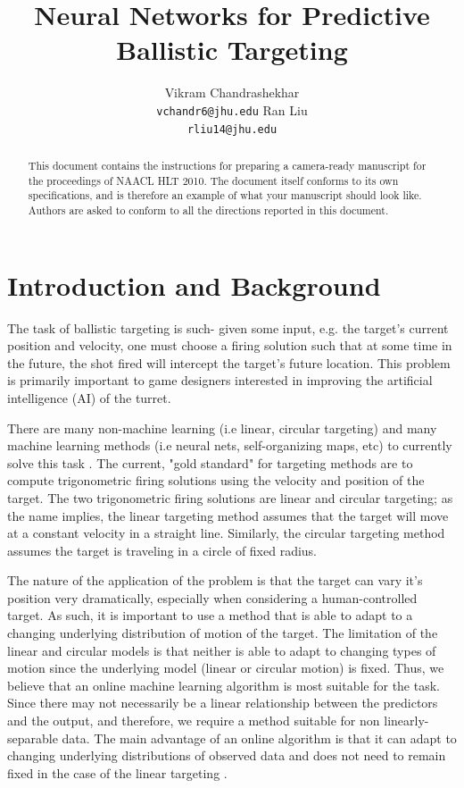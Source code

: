 \documentclass[11pt,letterpaper]{article}
\title{Neural Networks for Predictive Ballistic Targeting}
\author{Vikram Chandrashekhar\\
  {\tt vchandr6@jhu.edu}
  \And
  Ran Liu \\
  {\tt rliu14@jhu.edu}}
\date{}
\begin{document}
\maketitle

\begin{abstract}
  This document contains the instructions for preparing a camera-ready
  manuscript for the proceedings of NAACL HLT 2010. The document itself conforms
  to its own specifications, and is therefore an example of what
  your manuscript should look like.  Authors are asked to conform to
  all the directions reported in this document.
\end{abstract}

\section{Introduction and Background}

The task of ballistic targeting is such- given some input, e.g. the target's current position and velocity, one must choose a firing solution such that at some time in the future, the shot fired will intercept the target's future location. This problem is primarily important to game designers interested in improving the artificial intelligence (AI) of the turret.

There are many non-machine learning (i.e linear, circular targeting) and many machine learning methods (i.e neural nets, self-organizing maps, etc) to currently solve this task \cite{Guesgen_anartificial}. The current, "gold standard" for targeting methods are to compute trigonometric firing solutions using the velocity and position of the target. The two trigonometric firing solutions are linear and circular targeting; as the name implies, the linear targeting method assumes that the target will move at a constant velocity in a straight line. Similarly, the circular targeting method assumes the target is traveling in a circle of fixed radius.

The nature of the application of the problem is that the target can vary it's position very dramatically, especially when considering a human-controlled target. As such, it is important to use a method that is able to adapt to a changing underlying distribution of motion of the target. The limitation of the linear and circular models is that neither is able to adapt to changing types of motion since the underlying model (linear or circular motion) is fixed. Thus, we believe that an online machine learning algorithm is most suitable for the task. Since there may not necessarily be a linear relationship between the predictors and the output, and therefore, we require a method suitable for non linearly-separable data. The main advantage of an online algorithm is that it can adapt to changing underlying distributions of observed data and does not need to remain fixed in the case of the linear targeting \cite{Bottou98onlinelearning}.
\end{document}

